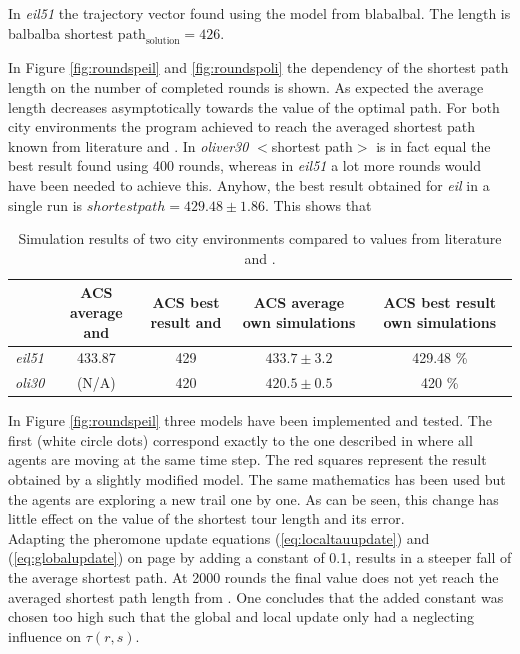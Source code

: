 In \emph{eil51} the trajectory vector found using the model from \cite{paper} blabalbal. The length is balbalba
$\text{shortest path}_\text{solution} = 426$.

In Figure \ref{fig:roundspeil} and \ref{fig:roundspoli} the dependency of the shortest path length on the number of completed rounds is shown. As expected the average length decreases asymptotically towards the value of the optimal path. For both city environments the program achieved to reach the averaged shortest path known from literature \cite{paper} and \cite{oli}. In \emph{oliver30} $<$shortest path$>$ is in fact equal the best result found using 400 rounds, whereas in \emph{eil51} a lot more rounds would have been needed to achieve this. Anyhow, the best result obtained for \emph{eil} in a single run is $shortest path=429.48 \pm 1.86$. This shows that \\

\begin{table}[h!]
\renewcommand{\arraystretch}{1.2}
\center
\begin{tabular}{|c|c|c|c|c|}
	\hline
		&ACS average	\cite{paper} and \cite{oli} &		ACS best result \cite{paper} and \cite{oli}	& 		ACS average own simulations	&	ACS best result own simulations \\\hline
	
		\emph{eil51}	&  433.87	&	429 	& $433.7 \pm 3.2$ & 429.48  \%	\\\hline
		\emph{oli30}	&  (N/A)	  	&	420		& $420.5 \pm 0.5$ & 420		\%		\\\hline
		

		
\end{tabular}
\caption{Simulation results of two city environments compared to values from literature \cite{paper} and \cite{oli}.}
\label{tab:val}
\end{table}








In Figure \ref{fig:roundspeil} three models have been implemented and tested. The first (white circle dots) correspond exactly to the one described in \cite{paper} where all agents are moving at the same time step. The red squares represent the result obtained by a slightly modified model. The same mathematics has been used but the agents are exploring a new trail one by one. As can be seen, this change has little effect on the value of the shortest tour length and its error.\\ Adapting the pheromone update equations (\ref{eq:localtauupdate}) and (\ref{eq:globalupdate}) on page \pageref{sec:model} by adding a constant of 0.1, results in a steeper fall of the average shortest path. At 2000 rounds the final value does not yet reach the averaged shortest path length from \cite{paper}. One concludes that the added constant was chosen too high such that the global and local update only had a neglecting influence on $\tau(r,s)$.\\




